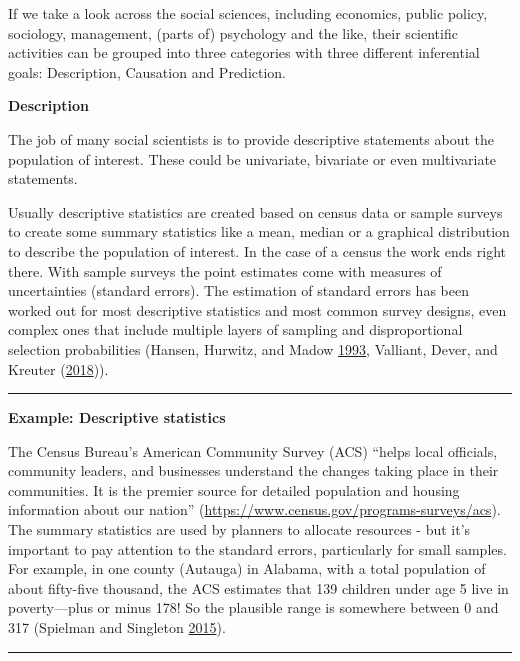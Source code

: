 \documentclass[]{krantz}
\begin{document}
If we take a look across the social sciences, including economics,
public policy, sociology, management, (parts of) psychology and the
like, their scientific activities can be grouped into three categories
with three different inferential goals: Description, Causation and
Prediction.

\textbf{Description}

The job of many social scientists is to provide descriptive statements
about the population of interest. These could be univariate, bivariate
or even multivariate statements.

Usually descriptive statistics are created based on census data or
sample surveys to create some summary statistics like a mean, median or
a graphical distribution to describe the population of interest. In the
case of a census the work ends right there. With sample surveys the
point estimates come with measures of uncertainties (standard errors).
The estimation of standard errors has been worked out for most
descriptive statistics and most common survey designs, even complex ones
that include multiple layers of sampling and disproportional selection
probabilities (Hansen, Hurwitz, and Madow
\protect\hyperlink{ref-hansen1993sample}{1993}, Valliant, Dever, and
Kreuter (\protect\hyperlink{ref-valliant2018practical}{2018})).

\begin{center}\rule{0.5\linewidth}{\linethickness}\end{center}

\textbf{Example: Descriptive statistics}

The Census Bureau's American Community Survey (ACS) ``helps local
officials, community leaders, and businesses understand the changes
taking place in their communities. It is the premier source for detailed
population and housing information about our nation''
(\url{https://www.census.gov/programs-surveys/acs}). The summary
statistics are used by planners to allocate resources - but it's
important to pay attention to the standard errors, particularly for
small samples. For example, in one county (Autauga) in Alabama, with a
total population of about fifty-five thousand, the ACS estimates that
139 children under age 5 live in poverty---plus or minus 178! So the
plausible range is somewhere between 0 and 317 (Spielman and Singleton
\protect\hyperlink{ref-Spielman2015}{2015}).

\begin{center}\rule{0.5\linewidth}{\linethickness}\end{center}
\end{document}
